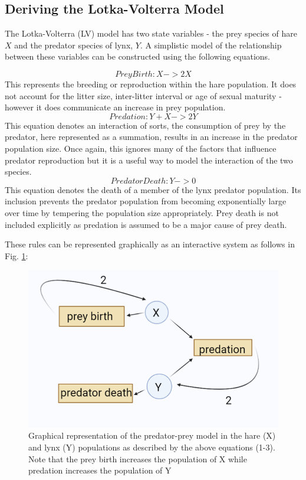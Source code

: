 \documentclass{article}
\begin{document}
\subsection{Deriving the Lotka-Volterra Model}
The Lotka-Volterra (LV) model has two state variables - the prey species of hare $X$ and the predator species of lynx, $Y$. A simplistic model of the relationship between these variables can be constructed using the following equations. 

\begin{equation}
    PreyBirth :  X -> 2X
\end{equation}
 This represents the breeding or reproduction within the hare population. It does not account for the litter size, inter-litter interval or age of sexual maturity - however it does communicate an increase in prey population.
\begin{equation}
    Predation :  Y + X -> 2Y
\end{equation}
This equation denotes an interaction of sorts, the consumption of prey by the predator, here represented as a summation, results in an increase in the predator population size. Once again, this ignores many of the factors that influence predator reproduction but it is a useful way to model the interaction of the two species. 
\begin{equation}
    PredatorDeath : Y -> 0
\end{equation}
This equation denotes the death of a member of the lynx predator population. Its inclusion prevents the predator population from becoming exponentially large over time by tempering the population size appropriately. Prey death is not included explicitly as predation is assumed to be a major cause of prey death. 

These rules can be represented graphically as an interactive system as follows in Fig. \ref{fig:systemGraph}: 

\begin{figure}[H]
  \includegraphics[scale = 0.6]{system_graph.PNG}
  \caption{Graphical representation of the predator-prey model in the hare (X) and lynx (Y) populations as described by the above equations (1-3). Note that the prey birth increases the population of X while predation increases the population of Y }
  \label{fig:systemGraph}
\end{figure}
\end{document}
